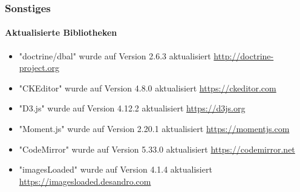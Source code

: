 \begin{frame}[fragile]
	\frametitle{Sonstiges}
	\framesubtitle{Aktualisierte Bibliotheken}

	\begin{itemize}
		\item "doctrine/dbal" wurde auf Version 2.6.3 aktualisiert\newline
			\smaller
				\href{http://doctrine-project.org}{http://doctrine-project.org}
			\normalsize

		\item "CKEditor" wurde auf Version 4.8.0 aktualisiert\newline
 			\smaller
				\href{https://ckeditor.com}{https://ckeditor.com}
			\normalsize

		\item "D3.js" wurde auf Version 4.12.2 aktualisiert\newline
			\smaller
				\href{https://d3js.org}{https://d3js.org}
			\normalsize

		\item "Moment.js" wurde auf Version 2.20.1 aktualisiert\newline
			\smaller
				\href{https://momentjs.com}{https://momentjs.com}
			\normalsize

		\item "CodeMirror" wurde auf Version 5.33.0 aktualisiert\newline
			\smaller
				\href{https://codemirror.net}{https://codemirror.net}
			\normalsize

		\item "imagesLoaded" wurde auf Version 4.1.4 aktualisiert\newline
			\smaller
				\href{https://imagesloaded.desandro.com}{https://imagesloaded.desandro.com}
			\normalsize

	\end{itemize}

\end{frame}

